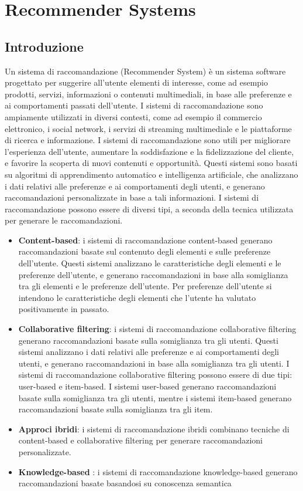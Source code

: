 \section{Recommender Systems}

\subsection{Introduzione}

Un sistema di raccomandazione (Recommender System) \cite{RecommenderOverview} è un sistema software progettato per suggerire all'utente elementi di interesse, come ad esempio prodotti, servizi, informazioni o contenuti multimediali, in base alle preferenze e ai comportamenti passati dell'utente. I sistemi di raccomandazione sono ampiamente utilizzati in diversi contesti, come ad esempio il commercio elettronico, i social network, i servizi di streaming multimediale e le piattaforme di ricerca e informazione. I sistemi di raccomandazione sono utili per migliorare l'esperienza dell'utente, aumentare la soddisfazione e la fidelizzazione del cliente, e favorire la scoperta di nuovi contenuti e opportunità.
Questi sistemi sono basati su algoritmi di apprendimento automatico e intelligenza artificiale, che analizzano i dati relativi alle preferenze e ai comportamenti degli utenti, e generano raccomandazioni personalizzate in base a tali informazioni. I sistemi di raccomandazione possono essere di diversi tipi, a seconda della tecnica utilizzata per generare le raccomandazioni.
\begin{itemize}
    \item \textbf{Content-based}: i sistemi di raccomandazione content-based generano raccomandazioni basate sul contenuto degli elementi e sulle preferenze dell'utente. Questi sistemi analizzano le caratteristiche degli elementi e le preferenze dell'utente, e generano raccomandazioni in base alla somiglianza tra gli elementi e le preferenze dell'utente. Per preferenze dell'utente si intendono le caratteristiche degli elementi che l'utente ha valutato positivamente in passato.
    
    \item \textbf{Collaborative filtering}: i sistemi di raccomandazione collaborative filtering generano raccomandazioni basate sulla somiglianza tra gli utenti. Questi sistemi analizzano i dati relativi alle preferenze e ai comportamenti degli utenti, e generano raccomandazioni in base alla somiglianza tra gli utenti. I sistemi di raccomandazione collaborative filtering possono essere di due tipi: user-based e item-based. I sistemi user-based generano raccomandazioni basate sulla somiglianza tra gli utenti, mentre i sistemi item-based generano raccomandazioni basate sulla somiglianza tra gli item.
    \item \textbf{Approci ibridi}: i sistemi di raccomandazione ibridi combinano tecniche di content-based e collaborative filtering per generare raccomandazioni personalizzate.
    \item \textbf{Knowledge-based} \cite{KnowledgeBased}: i sistemi di raccomandazione knowledge-based generano raccomandazioni basate basandosi su conoscenza semantica
\end{itemize}

